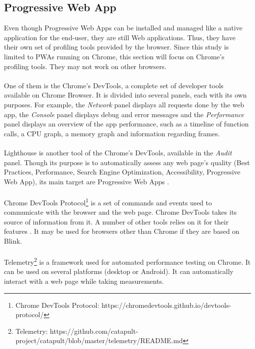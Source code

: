 \documentclass{kththesis}
\begin{document}
\subsection{Progressive Web App}

Even though Progressive Web Apps can be installed and managed like a native application for the end-user, they are still Web applications. Thus, they have their own set of profiling tools provided by the browser. Since this study is limited to PWAs running on Chrome, this section will focus on Chrome's profiling tools. They may not work on other browsers.

\paragraph{}
One of them is the Chrome's DevTools, a complete set of developer tools available on Chrome Browser. It is divided into several panels, each with its own purposes. For example, the \textit{Network} panel displays all requests done by the web app, the \textit{Console} panel displays debug and error messages and the \textit{Performance} panel \cite{chrome_devtools_perf} displays an overview of the app performance, such as a timeline of function calls, a CPU graph, a memory graph and information regarding frames. 

\paragraph{}
Lighthouse \cite{lighthouse} is another tool of the Chrome's DevTools, available in the \textit{Audit} panel. Though its purpose is to automatically assess any web page's quality (Best Practices, Performance, Search Engine Optimization, Accessibility, Progressive Web App), its main target are Progressive Web Apps \cite{PWApossibleUnifer}. 

\paragraph{}
Chrome DevTools Protocol\footnote{Chrome DevTools Protocol: https://chromedevtools.github.io/devtools-protocol/} is a set of commands and events used to communicate with the browser and the web page. Chrome DevTools takes its source of information from it. A number of other tools relies on it for their features \cite{awesome_CDP}. It may be used for browsers other than Chrome if they are based on Blink.

\paragraph{}
Telemetry\footnote{Telemetry: https://github.com/catapult-project/catapult/blob/master/telemetry/README.md} is a framework used for automated performance testing on Chrome. It can be used on several platforms (desktop or Android). It can automatically interact with a web page while taking measurements. 
\end{document}
